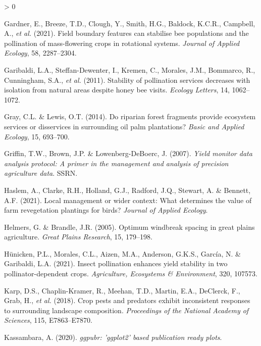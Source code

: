 \documentclass[]{elsarticle} %
\newlength{\cslhangindent}
\newenvironment{CSLReferences}[2] %
 {%
  \setlength{\parindent}{0pt}
  \ifodd #1 \everypar{\setlength{\hangindent}{\cslhangindent}}\ignorespaces\fi
  \ifnum #2 > 0
  \setlength{\parskip}{#2\baselineskip}
  \fi
 }%
 {}
\begin{document}
\begin{CSLReferences}{1}{0}
\leavevmode\hypertarget{ref-gardner2021}{}%
Gardner, E., Breeze, T.D., Clough, Y., Smith, H.G., Baldock, K.C.R., Campbell, A., \emph{et al.} (2021). Field boundary features can stabilise bee populations and the pollination of mass-flowering crops in rotational systems. \emph{Journal of Applied Ecology}, 58, 2287--2304.

\leavevmode\hypertarget{ref-garibaldi2011}{}%
Garibaldi, L.A., Steffan-Dewenter, I., Kremen, C., Morales, J.M., Bommarco, R., Cunningham, S.A., \emph{et al.} (2011). Stability of pollination services decreases with isolation from natural areas despite honey bee visits. \emph{Ecology Letters}, 14, 1062--1072.

\leavevmode\hypertarget{ref-gray2014}{}%
Gray, C.L. \& Lewis, O.T. (2014). Do riparian forest fragments provide ecosystem services or disservices in surrounding oil palm plantations? \emph{Basic and Applied Ecology}, 15, 693--700.

\leavevmode\hypertarget{ref-griffin2007}{}%
Griffin, T.W., Brown, J.P. \& Lowenberg-DeBoerc, J. (2007). \emph{Yield monitor data analysis protocol: A primer in the management and analysis of precision agriculture data}. SSRN.

\leavevmode\hypertarget{ref-haslem2021}{}%
Haslem, A., Clarke, R.H., Holland, G.J., Radford, J.Q., Stewart, A. \& Bennett, A.F. (2021). Local management or wider context: What determines the value of farm revegetation plantings for birds? \emph{Journal of Applied Ecology}.

\leavevmode\hypertarget{ref-helmers2005}{}%
Helmers, G. \& Brandle, J.R. (2005). Optimum windbreak spacing in great plains agriculture. \emph{Great Plains Research}, 15, 179--198.

\leavevmode\hypertarget{ref-hunicken2021}{}%
Hünicken, P.L., Morales, C.L., Aizen, M.A., Anderson, G.K.S., García, N. \& Garibaldi, L.A. (2021). Insect pollination enhances yield stability in two pollinator-dependent crops. \emph{Agriculture, Ecosystems {\&} Environment}, 320, 107573.

\leavevmode\hypertarget{ref-karp2018}{}%
Karp, D.S., Chaplin-Kramer, R., Meehan, T.D., Martin, E.A., DeClerck, F., Grab, H., \emph{et al.} (2018). Crop pests and predators exhibit inconsistent responses to surrounding landscape composition. \emph{Proceedings of the National Academy of Sciences}, 115, E7863--E7870.

\leavevmode\hypertarget{ref-kassambara2020}{}%
Kassambara, A. (2020). \emph{{ggpubr}: 'ggplot2' based publication ready plots}.


\end{CSLReferences}
\end{document}
